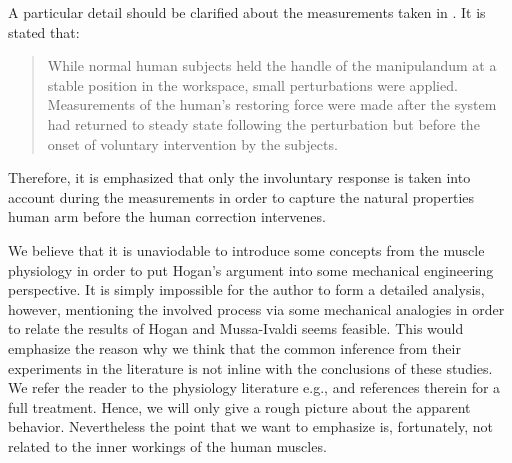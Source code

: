 \begin{rem}\label{rem:filament}
A particular detail should be clarified about the measurements taken in \cite{hogan89}. It is stated that: 
\begin{quote}
While normal human subjects held the handle of the manipulandum at a stable position
in the workspace, small perturbations were applied. Measurements
of the human's restoring force were made after the system
had returned to steady state following the perturbation but before
the onset of voluntary intervention by the subjects.
\end{quote}
Therefore, it is emphasized that only the involuntary response is taken into account during the measurements in order to
capture the natural properties human arm before the human correction intervenes. 
%
%
\end{rem}

We believe that it is unaviodable to introduce some concepts from the muscle physiology in order to put Hogan's 
argument into some mechanical engineering perspective. It is simply impossible for the author to form a detailed analysis, 
however, mentioning the involved process via some mechanical analogies in order to relate the results of 
Hogan and Mussa-Ivaldi seems feasible. This would emphasize the reason why we think that the common inference 
from their experiments in the literature is not inline with the conclusions of these studies. We refer the reader 
to the physiology literature e.g., \cite{spudich,millman,offer,horowits,yildiz,geeves} and references therein for a full 
treatment. Hence, we will only give a rough picture about the apparent behavior. Nevertheless the point that we want 
to emphasize is, fortunately, not related to the inner workings of the human muscles.




